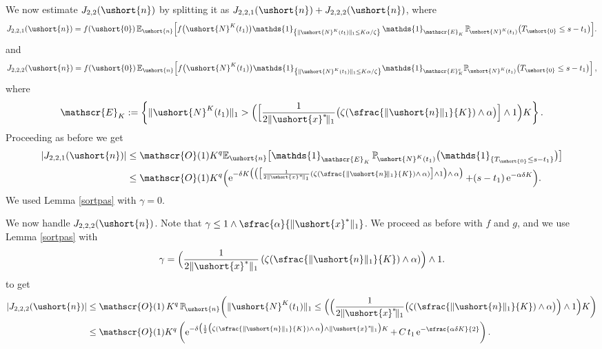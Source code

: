 \documentclass[10pt]{amsart}
\newcommand{\Psfrac}[2]{(\sfrac{#1}{#2})}
\let\mathcal\mathscr
\numberwithin{equation}{section}
\theoremstyle{plain}
\theoremstyle{definition}
\newcommand{\proba}{{\mathbb{P}}}
\newcommand{\E}{{\mathbb{E}}}
\newcommand{\Oun}{\mathcal{O}(1)}
\newcommand{\un}{\mathds{1}}
\newcommand{\vecn}{\ushort{n}}
\newcommand{\vecxf}{\ushort{x}^*}
\newcommand{\svecxf}{\ushort{x}^*}
\newcommand{\veczer}{\ushort{0}}
\newcommand{\leproc}{\ushort{N}^{K}}
\newcommand{\sleproc}{\ushort{N}^{K}}
\newcommand{\e}{\operatorname{e}}
\newcommand{\norm}[1]{\|#1\|_{1}}\let\snorm\norm
\begin{document}
We now estimate $J_{2,2}(\vecn)$ by splitting it as
$J_{2,2,1}(\vecn)+J_{2,2,2}(\vecn)$, where
\[
J_{2,2,1}(\vecn)=f(\veczer)\,\E_{\vecn}\Bigl[f\bigl(\leproc(t_{1})\bigr) \un_{\left\{\|\leproc(t_1)\|_1\leq K\alpha/\zeta\right\}} \,
\un_{\mathcal{E}_K}\,\proba_{\!\sleproc(t_{1}) } \bigl(T_{\veczer} \leq s-t_1\bigr)\Bigr].
\]
and
\[
J_{2,2,2}(\vecn)= f(\veczer)\,
\E_{\vecn}\!\left[
f\bigl(\leproc(t_{1})\bigr) \un_{\left\{\|\leproc(t_1)\|_1\leq K\alpha/\zeta\right\}}
\un_{\mathcal{E}_K^c}\proba_{\!\sleproc(t_{1}) } \bigl(T_{\veczer} \leq s-t_1\bigr)\right],
\]
where
\[
\mathcal{E}_K:=\left\{\|\leproc(t_1)\|_1 > \Bigl(\Bigl[\frac{1}{2\|\vecxf\!\|_1}
\bigl(\zeta\Psfrac{\norm{\vecn}}{K}\wedge \alpha\bigr)\Bigr]\wedge 1\Bigr){K}\right\}.
\]
Proceeding as before we get
\begin{align*}
|J_{2,2,1}(\vecn)|
& \leq \Oun K^{q}\E_{\vecn}\bigl[
\un_{\mathcal{E}_K}\,\proba_{\!\sleproc(t_{1}) } \bigl(\un_{\{T_{\veczer} \leq s-t_1\}}\bigr)\bigr]\\
& \leq \Oun K^{q}
\Bigl(\e^{-\delta K \bigl(\bigl(\bigl[\frac{1}{2\|\svecxf\!\|_{1}}(\zeta\Psfrac{\|\vecn\!\|_{1}}{K}\wedge\, \alpha)\bigr]\wedge 1\bigr)\wedge\, \alpha \bigr)}+(s-t_1) \e^{-\alpha\delta K}\Bigr).
\end{align*}
We used Lemma \ref{sortpas} with $\gamma=0$.

We now handle $J_{2,2,2}(\vecn)$. Note that $\gamma\leq 1\wedge \sfrac{\alpha}{\|\vecxf\|_{1}}$.
We proceed as before with $f$ and $g$, and we use Lemma \ref{sortpas} with
\[
\gamma= \Bigl(\frac{1}{2\|\vecxf\|_1} \left(\zeta\Psfrac{\|\vecn\|_1}{K}\wedge \alpha\right) \Bigr)\wedge 1.
\]
to get
\begin{align*}
|J_{2,2,2}(\vecn)|
& \leq \Oun\, K^{q}\,\proba_{\!\vecn} \biggl(
\|\leproc(t_1)\|_1 \le \Bigl(\Bigl(\frac{1}{2\|\vecxf\!\|_1}
\bigl(\zeta\Psfrac{\norm{\vecn}}{K}\wedge \alpha\bigr) \Bigr)\wedge 1 \Bigr){K} \biggr)\\
& \leq \Oun K^q
\left(\e^{-{\delta} \bigl(\frac{1}{2} \bigl(\zeta\Psfrac{\|\vecn\|_{1}}{K}\wedge\, \alpha\bigr)\wedge \|\vecxf\!\|_1\bigr)K}
+\, C\, t_1 \e^{-\sfrac{\alpha\delta K}{2}}\right).
\end{align*}
\end{document}
